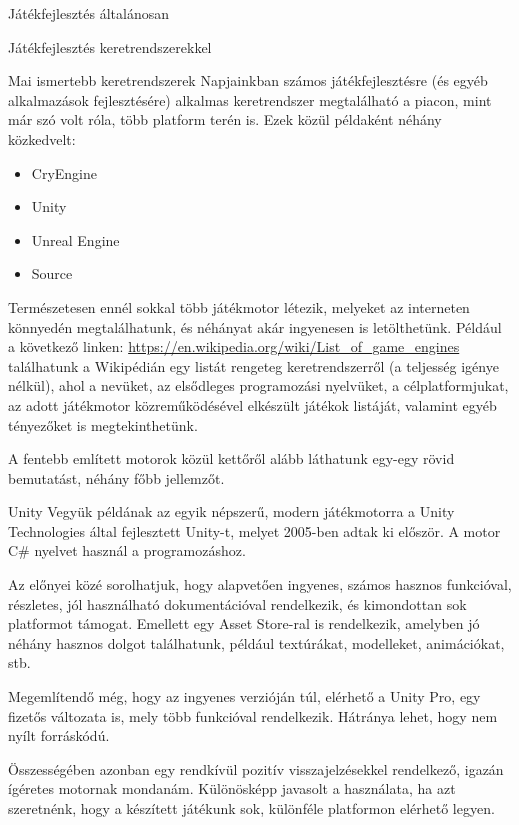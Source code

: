 \begin{MyChapter}{Játékfejlesztés általánosan}
\begin{MySection}{Játékfejlesztés keretrendszerekkel}
		\begin{MySubSection}{Mai ismertebb keretrendszerek}
		Napjainkban számos játékfejlesztésre (és egyéb alkalmazások fejlesztésére) alkalmas keretrendszer megtalálható a piacon, mint már szó volt róla, több platform terén is.
		\newline \newline
		Ezek közül példaként néhány közkedvelt:
		\begin{itemize}
			\item CryEngine
			\item Unity
			\item Unreal Engine
			\item Source
		\end{itemize}
		Természetesen ennél sokkal több játékmotor létezik, melyeket az interneten könnyedén megtalálhatunk, és néhányat akár ingyenesen is letölthetünk.
		Például a következő linken: \url{https://en.wikipedia.org/wiki/List\_of\_game\_engines} találhatunk a Wikipédián egy listát rengeteg keretrendszerről (a teljesség igénye nélkül), ahol a nevüket, az elsődleges programozási nyelvüket, a célplatformjukat, az adott játékmotor közreműködésével elkészült játékok listáját, valamint egyéb tényezőket is megtekinthetünk.
		
		A fentebb említett motorok közül kettőről alább láthatunk egy-egy rövid bemutatást, néhány főbb jellemzőt.
		\end{MySubSection}
	
		\begin{MySubSection}{Unity}
			Vegyük példának az egyik népszerű, modern játékmotorra a Unity Technologies által fejlesztett Unity-t, melyet 2005-ben adtak ki először. A motor C\# nyelvet használ a programozáshoz.
			
			Az előnyei közé sorolhatjuk, hogy alapvetően ingyenes, számos hasznos funkcióval, részletes, jól használható dokumentációval rendelkezik, és kimondottan sok platformot támogat. Emellett egy Asset Store-ral is rendelkezik, amelyben jó néhány hasznos dolgot találhatunk, például textúrákat, modelleket, animációkat, stb.
			
			Megemlítendő még, hogy az ingyenes verzióján túl, elérhető a Unity Pro, egy fizetős változata is, mely több funkcióval rendelkezik.
			Hátránya lehet, hogy nem nyílt forráskódú.
			
			Összességében azonban egy rendkívül pozitív visszajelzésekkel rendelkező, igazán ígéretes motornak mondanám. Különösképp javasolt a használata, ha azt szeretnénk, hogy a készített játékunk sok, különféle platformon elérhető legyen.


\end{MySubSection}
\end{MySection}
\end{MyChapter}
